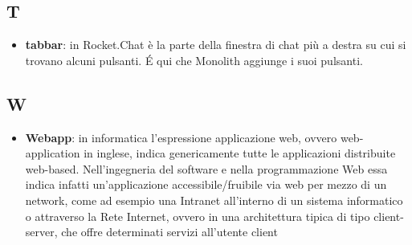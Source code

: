 \subsection*{T}
\begin{itemize}
\item
\textbf{tabbar}: in Rocket.Chat è la parte della finestra di chat più a destra su cui si trovano alcuni pulsanti. \'E qui che Monolith aggiunge i suoi pulsanti.
\end{itemize}
\newpage

\subsection*{W}
\begin{itemize}
\item
\textbf{Webapp}: in informatica l'espressione applicazione web, ovvero web-application in inglese, indica genericamente tutte le applicazioni distribuite web-based. Nell'ingegneria del software e nella programmazione Web essa indica infatti un'applicazione accessibile/fruibile via web per mezzo di un network, come ad esempio una Intranet all'interno di un sistema informatico o attraverso la Rete Internet, ovvero in una architettura tipica di tipo client-server, che offre determinati servizi all'utente client
\end{itemize}
\newpage